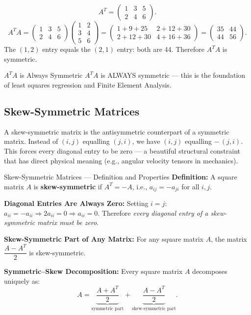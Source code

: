 \documentclass[12pt,a4paper]{article}
\begin{document}
\[
A^T = \begin{pmatrix} 1 & 3 & 5 \\ 2 & 4 & 6 \end{pmatrix}.
\]
\[
A^T A = \begin{pmatrix}1&3&5\\2&4&6\end{pmatrix}\begin{pmatrix}1&2\\3&4\\5&6\end{pmatrix} = \begin{pmatrix}1+9+25 & 2+12+30 \\ 2+12+30 & 4+16+36\end{pmatrix} = \begin{pmatrix}35 & 44 \\ 44 & 56\end{pmatrix}.
\]
The $(1,2)$ entry equals the $(2,1)$ entry: both are 44. Therefore $A^T A$ is symmetric. \checkmark

\begin{learnbox}{$A^T A$ is Always Symmetric}
$A^T A$ is ALWAYS symmetric --- this is the foundation of least squares regression and Finite Element Analysis.
\end{learnbox}

\subsection{Skew-Symmetric Matrices}

A skew-symmetric matrix is the antisymmetric counterpart of a symmetric matrix. Instead of $(i,j)$ equalling $(j,i)$, we have $(i,j)$ equalling $-\,(j,i)$. This forces every diagonal entry to be zero --- a beautiful structural constraint that has direct physical meaning (e.g., angular velocity tensors in mechanics).

\begin{infobox}{Skew-Symmetric Matrices --- Definition and Properties}
\textbf{Definition:} A square matrix $A$ is \textbf{skew-symmetric} if $A^T = -A$, i.e., $a_{ij} = -a_{ji}$ for all $i, j$.

\textbf{Diagonal Entries Are Always Zero:} Setting $i = j$: $a_{ii} = -a_{ii} \Rightarrow 2a_{ii} = 0 \Rightarrow a_{ii} = 0$. Therefore \emph{every diagonal entry of a skew-symmetric matrix must be zero}.

\textbf{Skew-Symmetric Part of Any Matrix:} For any square matrix $A$, the matrix $\dfrac{A - A^T}{2}$ is skew-symmetric.

\textbf{Symmetric--Skew Decomposition:} Every square matrix $A$ decomposes uniquely as:
\[
A = \underbrace{\frac{A + A^T}{2}}_{\text{symmetric part}} + \underbrace{\frac{A - A^T}{2}}_{\text{skew-symmetric part}}.
\]
\end{infobox}
\end{document}
